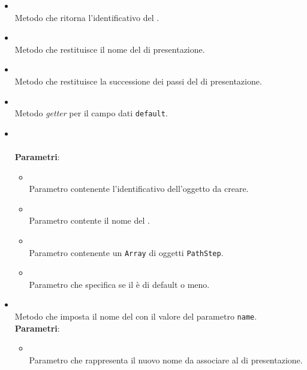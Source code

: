 \begin{itemize}
\begin{itemize}
\item {}
\\ Metodo che ritorna l'identificativo del .
\item {}
\\ Metodo che restituisce il nome del  di presentazione.
\item {}
\\ Metodo che restituisce la successione dei passi del  di presentazione.
\item {}
\\ Metodo \textit{getter} per il campo dati \texttt{default}.
\item {}
\\ \dpConstructor
\\ \textbf{Parametri}:
\begin{itemize}
\item {}
\\ Parametro contenente l'identificativo dell'oggetto da creare.
\item {}
\\ Parametro contente il nome del .
\item {}
\\ Parametro contenente un \texttt{Array} di oggetti \texttt{PathStep}.
\item {}
\\ Parametro che specifica se il  è di default o meno.
\end{itemize}
\item {}
\\ Metodo che imposta il nome del  con il valore del parametro \texttt{name}.
\\ \textbf{Parametri}:
\begin{itemize}
\item {}
\\ Parametro che rappresenta il nuovo nome da associare al  di presentazione.
\end{itemize}
\end{itemize}
\end{itemize}
